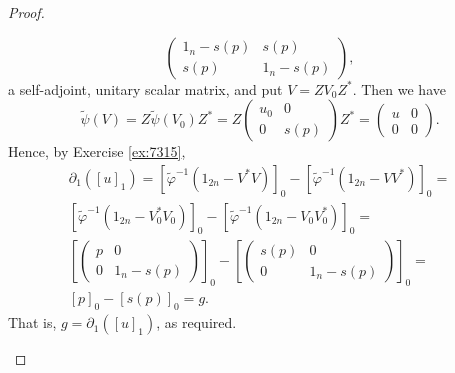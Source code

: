 \documentclass{book}
\begin{document}
\begin{proof}
\begin{enumerate}
\[\begin{pmatrix}
        1_n-s(p)&s(p)\\s(p)&1_n-s(p)
      \end{pmatrix},
    \]
    a self-adjoint, unitary scalar matrix, and put \(V=ZV_0Z^*\). Then we have
    \[
      \tilde{\psi}(V)=Z\tilde{\psi}(V_0)Z^*=Z\begin{pmatrix}
        u_0&0\\0&s(p)
      \end{pmatrix}
      Z^*=\begin{pmatrix}
        u&0\\0&0
      \end{pmatrix}.
    \]
    Hence, by Exercise \ref{ex:7315},
    \begin{align*}
      \partial_1({[u]}_1)={[\tilde{\varphi}^{-1}(1_{2n}-V^*V)]}_0-{[\tilde{\varphi}^{-1}(1_{2n}-VV^*)]}_0=\\
      {[\tilde{\varphi}^{-1}(1_{2n}-V_0^*V_0)]}_0-{[\tilde{\varphi}^{-1}(1_{2n}-V_0V_0^*)]}_0=\\
      {[\begin{pmatrix}
        p&0\\0&1_n-s(p)
      \end{pmatrix}]}_0-
      {[\begin{pmatrix}
        s(p)&0\\0&1_n-s(p)
      \end{pmatrix}]}_0=\\
      {[p]}_0-{[s(p)]}_0=g.
    \end{align*}
    That is, \(g=\partial_1({[u]}_1)\), as required.
  \end{enumerate}
\end{proof}
\end{document}
